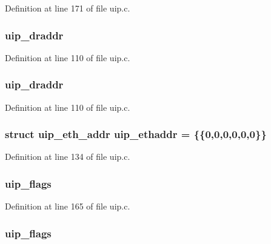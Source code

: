 Definition at line 171 of file uip.c.

\hypertarget{group__uip_ga20df5c82f2a15a508c19e505b5d9de2b}{
\subsubsection[{uip\_\-draddr}]{ {\bf uip\_\-draddr}}}
\label{group__uip_ga20df5c82f2a15a508c19e505b5d9de2b}


Definition at line 110 of file uip.c.

\hypertarget{group__uip_ga20df5c82f2a15a508c19e505b5d9de2b}{
\subsubsection[{uip\_\-draddr}]{ {\bf uip\_\-draddr}}}
\label{group__uip_ga20df5c82f2a15a508c19e505b5d9de2b}


Definition at line 110 of file uip.c.

\hypertarget{group__uip_ga499bb98a0b4ae9a98553ede81317606d}{
\subsubsection[{uip\_\-ethaddr}]{\setlength{\rightskip}{0pt plus 5cm}struct {\bf uip\_\-eth\_\-addr} {\bf uip\_\-ethaddr} = \{\{0,0,0,0,0,0\}\}}}
\label{group__uip_ga499bb98a0b4ae9a98553ede81317606d}


Definition at line 134 of file uip.c.

\hypertarget{group__uip_gab4ef6b00924990e7a293f66715b6d1d1}{
\subsubsection[{uip\_\-flags}]{ {\bf uip\_\-flags}}}
\label{group__uip_gab4ef6b00924990e7a293f66715b6d1d1}


Definition at line 165 of file uip.c.

\hypertarget{group__uip_gab4ef6b00924990e7a293f66715b6d1d1}{
\subsubsection[{uip\_\-flags}]{ {\bf uip\_\-flags}}}
\label{group__uip_gab4ef6b00924990e7a293f66715b6d1d1}


